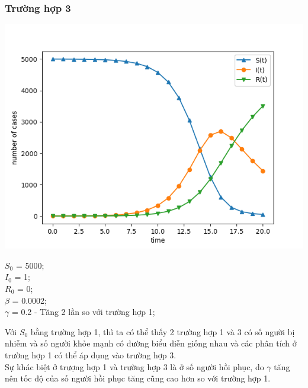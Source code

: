 \documentclass[a4paper]{article}
\begin{document}
\subsubsection{Trường hợp 3}
\begin{center}
\includegraphics{Images/5000 1 0 0_0002 0_2.png}
\end{center}
\begin{flushleft}
$S_0$ = 5000;\\
$I_0$ = 1;\\
$R_0$ = 0;\\
$\beta$ = 0.0002;\\
$\gamma$ = 0.2 - Tăng 2 lần so với trường hợp 1;\\
\end{flushleft}
Với $S_0$ bằng trường hợp 1, thì ta có thể thấy 2 trường hợp 1 và 3 có số người bị nhiễm và số người khỏe mạnh có đường biểu diễn giống nhau và các phân tích ở trường hợp 1 có thể áp dụng vào trường hợp 3.\\
Sự khác biệt ở trượng hợp 1 và trường hợp 3 là ở số người hồi phục, do $\gamma$ tăng nên tốc độ của số người hồi phục tăng cũng cao hơn so với trường hợp 1.
\end{document}
